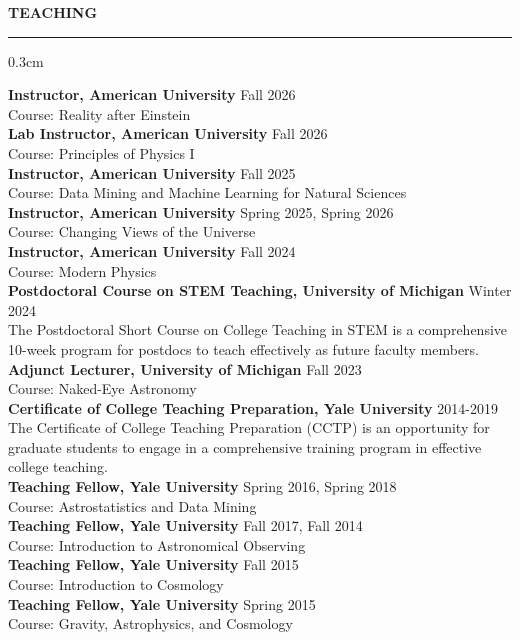 \documentclass[12pt]{article}
\renewenvironment{section}[1]
  {
  \medskip
  {\color{aublue} \MakeUppercase{\bf #1}}
  \smallskip
  \hrule
  \medskip
  \begin{adjustwidth}{0.3cm}{}
  }
  {
  \end{adjustwidth}
  }
\newcommand{\entry}[3]{{\bf #1} \hfill {#2} \\ {#3}}
\begin{document}
\begin{section}{Teaching}
  \entry{Instructor, American University}{Fall 2026}{Course: Reality after Einstein} \\
  \entry{Lab Instructor, American University}{Fall 2026}{Course: Principles of Physics I} \\
  \entry{Instructor, American University}{Fall 2025}{Course: Data Mining and Machine Learning for Natural Sciences} \\
  \entry{Instructor, American University}{Spring 2025, Spring 2026}{Course: Changing Views of the Universe} \\
  \entry{Instructor, American University}{Fall 2024}{Course: Modern Physics} \\
  \entry{Postdoctoral Course on STEM Teaching, University of Michigan}{Winter 2024}{The Postdoctoral Short Course on College Teaching in STEM is a comprehensive 10-week program for postdocs to teach effectively as future faculty members.} \\
  \entry{Adjunct Lecturer, University of Michigan}{Fall 2023}{Course: Naked-Eye Astronomy} \\
  \entry{Certificate of College Teaching Preparation, Yale University}{2014-2019}{The Certificate of College Teaching Preparation (CCTP) is an opportunity for graduate students to engage in a comprehensive training program in effective college teaching.} \\
  \entry{Teaching Fellow, Yale University}{Spring 2016, Spring 2018}{Course: Astrostatistics and Data Mining} \\
  \entry{Teaching Fellow, Yale University}{Fall 2017, Fall 2014}{Course: Introduction to Astronomical Observing} \\
  \entry{Teaching Fellow, Yale University}{Fall 2015}{Course: Introduction to Cosmology} \\
  \entry{Teaching Fellow, Yale University}{Spring 2015}{Course: Gravity, Astrophysics, and Cosmology}
\end{section}
\end{document}
